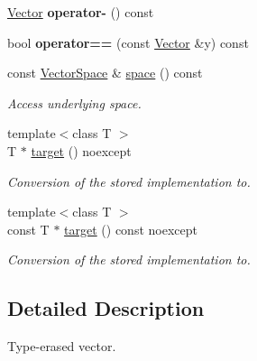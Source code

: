 \begin{DoxyCompactItemize}
\item 
\hypertarget{classSpacy_1_1Vector_a050dba43b304fdf5f15141d25465be56}{\hyperlink{classSpacy_1_1Vector}{\-Vector} {\bfseries operator-\/} () const }\label{classSpacy_1_1Vector_a050dba43b304fdf5f15141d25465be56}

\item 
\hypertarget{classSpacy_1_1Vector_a0d634e69572e8da07c3c7056ec911208}{bool {\bfseries operator==} (const \hyperlink{classSpacy_1_1Vector}{\-Vector} \&y) const }\label{classSpacy_1_1Vector_a0d634e69572e8da07c3c7056ec911208}

\item 
\hypertarget{classSpacy_1_1Vector_a8a549d4ed045ddf563afca5bc942397b}{const \hyperlink{classSpacy_1_1VectorSpace}{\-Vector\-Space} \& \hyperlink{classSpacy_1_1Vector_a8a549d4ed045ddf563afca5bc942397b}{space} () const }\label{classSpacy_1_1Vector_a8a549d4ed045ddf563afca5bc942397b}

\begin{DoxyCompactList}\small\item\em \-Access underlying space. \end{DoxyCompactList}\item 
{\footnotesize template$<$class T $>$ }\\\-T $\ast$ \hyperlink{classSpacy_1_1Vector_ace5b6585249e3f37cacdc92e3d974623}{target} () noexcept
\begin{DoxyCompactList}\small\item\em \-Conversion of the stored implementation to. \end{DoxyCompactList}\item 
{\footnotesize template$<$class T $>$ }\\const \-T $\ast$ \hyperlink{classSpacy_1_1Vector_a32cd1f62131a09d7893a03dd1039abe9}{target} () const noexcept
\begin{DoxyCompactList}\small\item\em \-Conversion of the stored implementation to. \end{DoxyCompactList}\end{DoxyCompactItemize}


\subsection{\-Detailed \-Description}
\-Type-\/erased vector. 

